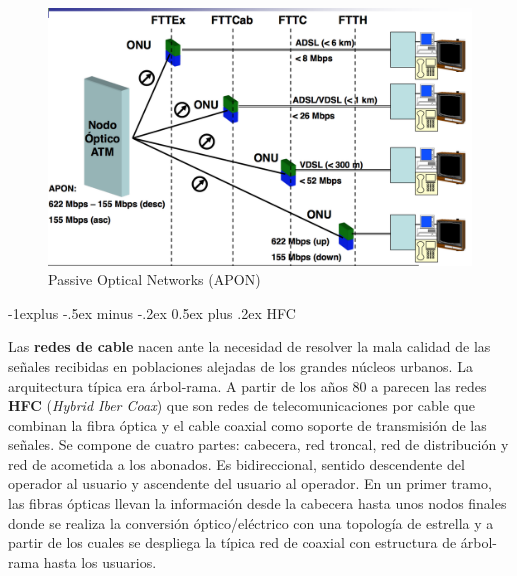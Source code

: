 \documentclass[10pt,portrait, twocolumn]{article}
\makeatletter
\renewcommand{\subsection}{\@startsection{subsection}{2}{0mm}%
                                {-1explus -.5ex minus -.2ex}%
                                {0.5ex plus .2ex}%
                                {\normalfont\normalsize\bfseries}}
\makeatother
\begin{document}

	\begin{figure}[!ht]
 		\centering
  		 \includegraphics[scale = 0.35]{images/APON}
		\caption{Passive Optical Networks (APON)}
	\end{figure}

\hrulefill

\subsection{HFC}

Las \textbf{redes de cable} nacen ante la necesidad de resolver la mala calidad de las señales recibidas en poblaciones alejadas de los grandes núcleos urbanos. La arquitectura típica era árbol-rama. A partir de los años 80 a parecen las redes \textbf{HFC} (\textit{Hybrid Iber Coax}) que son redes de telecomunicaciones por cable que combinan la fibra óptica y el cable coaxial como soporte de transmisión de las señales. Se compone de cuatro partes: cabecera, red troncal, red de distribución y red de acometida a los abonados. Es bidireccional, sentido descendente del operador al usuario y ascendente del usuario al operador. En un primer tramo, las fibras ópticas llevan la información desde la cabecera hasta unos nodos finales donde se realiza la conversión óptico/eléctrico con una topología de estrella y a partir de los cuales se despliega la típica red de coaxial con estructura de árbol-rama hasta los usuarios.
\end{document}
